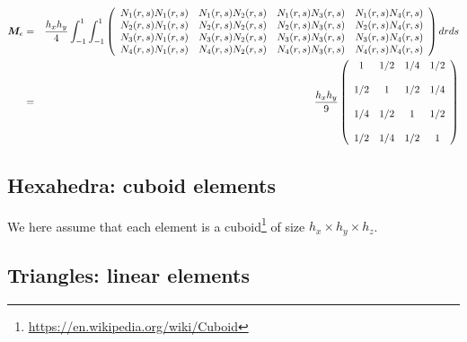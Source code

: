 \begin{eqnarray}
{\bm M}_e 
&=&   \frac{h_xh_y}{4} \int_{-1}^1 \int_{-1}^{1}
\left(
\begin{array}{cccc}
N_1(r,s)N_1(r,s) &  N_1(r,s)N_2(r,s) &  N_1(r,s)N_3(r,s) & N_1(r,s)N_4(r,s) \\
N_2(r,s)N_1(r,s) &  N_2(r,s)N_2(r,s) &  N_2(r,s)N_3(r,s) & N_2(r,s)N_4(r,s) \\
N_3(r,s)N_1(r,s) &  N_3(r,s)N_2(r,s) &  N_3(r,s)N_3(r,s) & N_3(r,s)N_4(r,s) \\
N_4(r,s)N_1(r,s) &  N_4(r,s)N_2(r,s) &  N_4(r,s)N_3(r,s) & N_4(r,s)N_4(r,s) 
\end{array}
\right)
dr ds\nonumber\\
&=&
\frac{h_x h_y}{9}
\left(
\begin{array}{cccc}
1 & 1/2 & 1/4 & 1/2 \\ \\ 
1/2 & 1   & 1/2 & 1/4 \\ \\
1/4 & 1/2 & 1 & 1/2 \\ \\
1/2 & 1/4 & 1/2 & 1  
\end{array}
\right)
\end{eqnarray}





\subsection{Hexahedra: cuboid elements}

We here assume that each element is a cuboid\footnote{\url{https://en.wikipedia.org/wiki/Cuboid}} 
of size $h_x \times h_y \times h_z$. 



\subsection{Triangles: linear elements}


